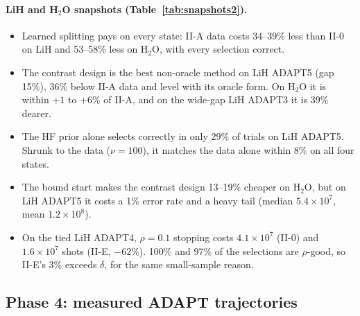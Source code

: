 \documentclass[10.5pt]{article}
\begin{document}
\paragraph{LiH and H$_2$O snapshots (Table~\ref{tab:snapshots2}).}
\begin{itemize}
  \item Learned splitting pays on every state: II-A data costs 34--39\% less than II-0 on LiH and 53--58\% less on H$_2$O, with every selection correct.
  \item The contrast design is the best non-oracle method on LiH ADAPT5 (gap 15\%), 36\% below II-A data and level with its oracle form. On H$_2$O it is within $+1$ to $+6\%$ of II-A, and on the wide-gap LiH ADAPT3 it is 39\% dearer.
  \item The HF prior alone selects correctly in only 29\% of trials on LiH ADAPT5. Shrunk to the data ($\nu=100$), it matches the data alone within 8\% on all four states.
  \item The bound start makes the contrast design 13--19\% cheaper on H$_2$O, but on LiH ADAPT5 it costs a 1\% error rate and a heavy tail (median $5.4\times10^7$, mean $1.2\times10^8$).
  \item On the tied LiH ADAPT4, $\rho=0.1$ stopping costs $4.1\times10^7$ (II-0) and $1.6\times10^7$ shots (II-E, $-62\%$). 100\% and 97\% of the selections are $\rho$-good, so II-E's 3\% exceeds $\delta$, for the same small-sample reason.
\end{itemize}

\subsection{Phase 4: measured ADAPT trajectories}
\end{document}
